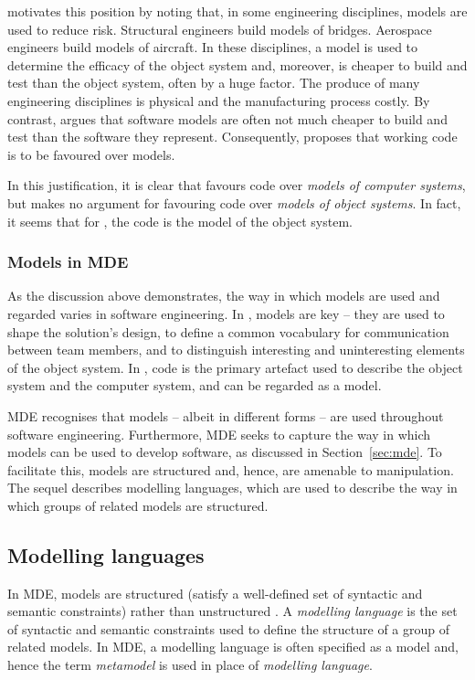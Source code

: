 \cite{martin06agile} motivates this position by noting that, in some engineering disciplines, models are used to reduce risk. Structural engineers build models of bridges. Aerospace engineers build models of aircraft. In these disciplines, a model is used to determine the efficacy of the object system and, moreover, is cheaper to build and test than the object system, often by a huge factor. The produce of many engineering disciplines is physical and the manufacturing process costly. By contrast, \cite{martin06agile} argues that software models are often not much cheaper to build and test than the software they represent. Consequently, \cite{martin06agile} proposes that working code is to be favoured over models.

In this justification, it is clear that \cite{martin06agile} favours code over \emph{models of computer systems}, but makes no argument for favouring code over \emph{models of object systems}. In fact, it seems that for \cite{martin06agile}, the code is the model of the object system.

\subsubsection{Models in MDE}
As the discussion above demonstrates, the way in which models are used and regarded varies in software engineering. In \cite{evans04domain}, models are key -- they are used to shape the solution's design, to define a common vocabulary for communication between team members, and to distinguish interesting and uninteresting elements of the object system. In \cite{martin06agile}, code is the primary artefact used to describe the object system and the computer system, and can be regarded as a model.

MDE recognises that models -- albeit in different forms -- are used throughout software engineering. Furthermore, MDE seeks to capture the way in which models can be used to develop software, as discussed in Section~\ref{sec:mde}. To facilitate this, models are structured and, hence, are amenable to manipulation. The sequel describes modelling languages, which are used to describe the way in which groups of related models are structured.

\subsection{Modelling languages}
\label{subsec:modelling_languages}
In MDE, models are structured (satisfy a well-defined set of syntactic and semantic constraints) rather than unstructured \cite{kolovos09thesis}. A \emph{modelling language} is the set of syntactic and semantic constraints used to define the structure of a group of related models. In MDE, a modelling language is often specified as a model and, hence the term \emph{metamodel} is used in place of \emph{modelling language}.

